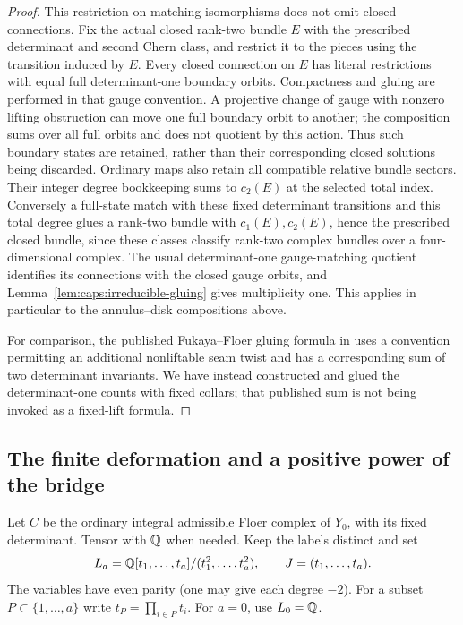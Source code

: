 \begin{proof}
This restriction on matching isomorphisms does not omit closed
connections.  Fix the actual closed rank-two bundle $E$ with the
prescribed determinant and second Chern class, and restrict it to the
pieces using the transition induced by $E$.  Every closed connection on
$E$ has literal restrictions with equal full determinant-one boundary
orbits.  Compactness and gluing are performed in that gauge convention.
A projective change of gauge with nonzero lifting obstruction can move
one full boundary orbit to another; the composition sums over all full
orbits and does not quotient by this action.  Thus such boundary states
are retained, rather than their corresponding closed solutions being
discarded.  Ordinary maps also retain all compatible relative bundle
sectors.  Their integer degree bookkeeping sums to $c_2(E)$ at the
selected total index.  Conversely a full-state match with these fixed
determinant transitions and this total degree glues a rank-two bundle
with $c_1(E),c_2(E)$, hence the prescribed closed bundle, since these
classes classify rank-two complex bundles over a four-dimensional
complex.  The usual determinant-one gauge-matching quotient identifies
its connections with the closed gauge orbits, and
Lemma~\ref{lem:caps:irreducible-gluing} gives multiplicity one.  This
applies in particular to the annulus--disk compositions above.

For comparison, the published
Fukaya--Floer gluing formula in \cite[Theorem~3.1]{Munoz1999FukayaFloer}
uses a convention permitting an additional nonliftable seam twist and
has a corresponding sum of two determinant invariants.  We have instead
constructed and glued the determinant-one counts with fixed collars;
that published sum is not being invoked as a fixed-lift formula.
\end{proof}

\subsection{The finite deformation and a positive power of the bridge}

Let $C$ be the ordinary integral admissible Floer complex of $Y_0$,
with its fixed determinant.  Tensor with $\mathbb Q$ when needed.  Keep the
labels distinct and set
\begin{equation}\label{eq:caps:label-ring}
 L_a=\mathbb Q[t_1,\ldots,t_a]/(t_1^2,\ldots,t_a^2),
 \qquad J=(t_1,\ldots,t_a).
\end{equation}
The variables have even parity (one may give each degree $-2$).
For a subset $P\subset\{1,\ldots,a\}$ write $t_P=\prod_{i\in P}t_i$.
For $a=0$, use $L_0=\mathbb Q$.

